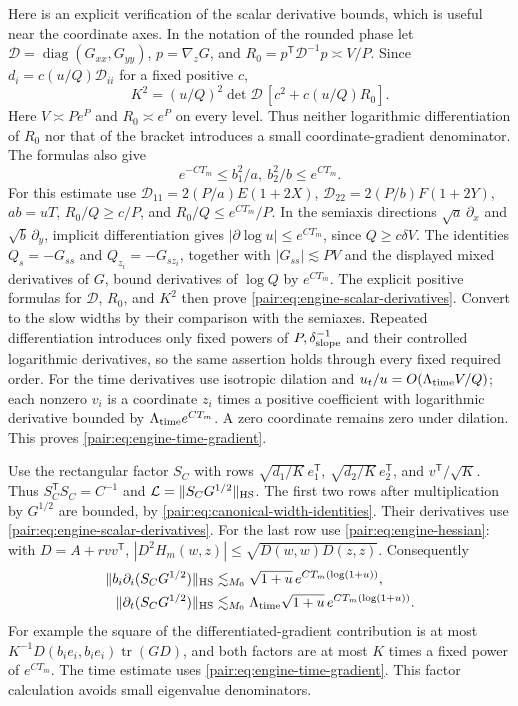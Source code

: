\documentclass[11pt]{article}
\numberwithin{equation}{section}
\begin{document}
Here is an explicit verification of the scalar derivative bounds,
which is useful near the coordinate axes. In the notation of the
rounded phase let $\mathcal D=\operatorname{diag}(G_{xx},G_{yy})$,
$p=\nabla_zG$, and $R_0=p^{\mathsf T}\mathcal D^{-1}p\asymp V/P$.
Since $d_i=c(u/Q)\mathcal D_{ii}$ for a fixed positive $c$,
\[
 K^2=(u/Q)^2\det\mathcal D\,[c^2+c(u/Q)R_0].
\]
Here $V\asymp Pe^P$ and $R_0\asymp e^P$ on every level. Thus neither
logarithmic differentiation of $R_0$ nor that of the bracket introduces
a small coordinate-gradient denominator. The formulas also give
\[
 e^{-CT_m}\le b_1^2/a,\ b_2^2/b\le e^{CT_m}.
\]
For this estimate use
$\mathcal D_{11}=2(P/a)E(1+2X)$,
$\mathcal D_{22}=2(P/b)F(1+2Y)$, $ab=uT$,
$R_0/Q\ge c/P$, and $R_0/Q\le e^{CT_m}/P$.
In the semiaxis directions $\sqrt a\,\partial_x$ and
$\sqrt b\,\partial_y$, implicit differentiation gives
$|\partial\log u|\le e^{CT_m}$, since $Q\ge c\delta V$.
The identities $Q_s=-G_{ss}$ and $Q_{z_i}=-G_{sz_i}$, together
with $|G_{ss}|\lesssim PV$ and the displayed mixed derivatives of
$G$, bound derivatives of $\log Q$ by $e^{CT_m}$.
The explicit positive formulas for $\mathcal D$, $R_0$, and $K^2$
then prove \eqref{pair:eq:engine-scalar-derivatives}.
Convert to the slow widths by their comparison with the semiaxes.
Repeated differentiation introduces only fixed powers of
$P,\delta_{\rm slope}^{-1}$ and their controlled logarithmic derivatives, so
the same assertion holds through every fixed required order.
For the time derivatives use isotropic dilation and
$u_t/u=O(\Lambda_{\rm time} V/Q)$; each nonzero $v_i$ is a coordinate $z_i$
times a positive coefficient with logarithmic derivative bounded
by $\Lambda_{\rm time} e^{CT_m}$. A zero coordinate remains zero under
dilation. This proves \eqref{pair:eq:engine-time-gradient}.

Use the rectangular factor $S_C$ with rows
$\sqrt{d_1/K}\,e_1^{\mathsf T}$,
$\sqrt{d_2/K}\,e_2^{\mathsf T}$, and $v^{\mathsf T}/\sqrt K$.
Thus $S_C^{\mathsf T}S_C=C^{-1}$ and
$\mathcal L=\|S_CG^{1/2}\|_{\rm HS}$. The first two rows after
multiplication by $G^{1/2}$ are bounded, by
\eqref{pair:eq:canonical-width-identities}. Their derivatives use
\eqref{pair:eq:engine-scalar-derivatives}. For the last row use
\eqref{pair:eq:engine-hessian}: with $D=A+rvv^{\mathsf T}$,
$|D^2H_m(w,z)|\le\sqrt{D(w,w)D(z,z)}$. Consequently
\begin{align}\label{pair:eq:general-lag-derivatives}
 \|b_i\partial_i(S_CG^{1/2})\|_{\rm HS}
 &\lesssim_{M_0}\sqrt{1+u}\,e^{CT_m(\log(1+u))},\notag\\
 \|\partial_t(S_CG^{1/2})\|_{\rm HS}
 &\lesssim_{M_0}\Lambda_{\rm time}\sqrt{1+u}\,e^{CT_m(\log(1+u))}.
\end{align}
For example the square of the differentiated-gradient contribution is
at most $K^{-1}D(b_ie_i,b_ie_i)\operatorname{tr}(GD)$, and both
factors are at most $K$ times a fixed power of $e^{CT_m}$.
The time estimate uses \eqref{pair:eq:engine-time-gradient}.
This factor calculation avoids small eigenvalue denominators.
\end{document}
